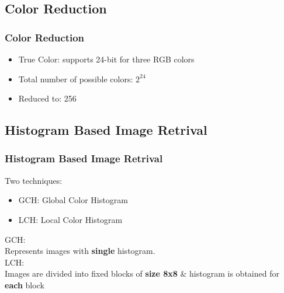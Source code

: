 \documentclass[15pt]{beamer}
\begin{document}
\subsection{Color Reduction}
\begin{frame}
\frametitle{Color Reduction}
\begin{itemize}[label=$\blacksquare$]
\pause
\item True Color: supports 24-bit for three RGB colors\\[\baselineskip]
\pause
\item Total number of possible colors: $2^{24}$\\[\baselineskip]
\pause
\item Reduced to: 256
\end{itemize}
\end{frame}

\subsection{Histogram Based Image Retrival}
\begin{frame}
\frametitle{Histogram Based Image Retrival}
Two techniques:\\[\baselineskip]
\pause
\begin{itemize}[label=$\blacksquare$]
\item GCH: Global Color Histogram
\pause
\item LCH: Local Color Histogram\\[\baselineskip]
\pause
\end{itemize}
GCH:\\[\baselineskip] Represents images with \textbf{single} histogram.\\[\baselineskip]
\pause
LCH:\\[\baselineskip] Images are divided into fixed blocks of \textbf{size 8x8} \& histogram is obtained for \textbf{each} block
\end{frame}
\end{document}
